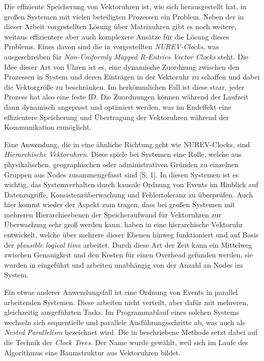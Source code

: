 Die effiziente Speicherung von Vektoruhren ist, wie sich herausgestellt hat, in großen Systemen mit vielen beteiligten Prozessen ein Problem. Neben der in dieser Arbeit vorgestellten Lösung über Matrixuhren gibt es noch weitere, weitaus effizientere aber auch komplexere Ansätze für die Lösung dieses Problems. Eines davon sind die in \cite{Gidenstam2004} vorgestellten \textit{NUREV-Clocks}, was ausgeschreiben für \textit{Non-Uniformly Mapped R-Entries Vector Clocks} steht. Die Idee dieser Art von Uhren ist es, eine dynamische Zuordnung zwischen den Prozessen in System und deren Einträgen in der Vektoruhr zu schaffen und dabei die Vektorgröße zu beschränken. Im herkömmlichen Fall ist diese starr, jeder Prozess hat also eine feste ID. Die Zuordnungen können während der Laufzeit dann dynamisch angepasst und optimiert werden, was im Endeffekt eine effizientere Speicherung und Übertragung der Vektoruhren während der Kommunikation ermöglicht.

Eine Anwendung, die in eine ähnliche Richtung geht wie NUREV-Clocks, sind \textit{Hierarchische Vektoruhren}. Diese spiele bei Systemen eine Rolle, welche aus physikalischen, geographischen oder administrativen Gründen zu einzelnen Gruppen aus Nodes zusammengefasst sind \cite{Khotimsky1999}[S. 1]. In diesen Systemen ist es wichtig, das Systemverhalten durch kausale Ordnung von Events im Hinblick auf Datenzugriffe, Konsistenzüberwachung und Fehlertoleranz zu überprüfen. Auch hier kommt wieder der Aspekt zum tragen, dass bei großen Systemen mit mehreren Hierarchieebenen der Speicheraufwand für Vektoruhren zur Überwachung sehr groß werden kann.  haben in  \cite{Khotimsky1999} eine hierarchische Vektoruhr entwickelt, welche über mehrere dieser Ebenen hinweg funktioniert und auf Basis der \textit{plausible logical time} arbeitet. Durch diese Art der Zeit kann ein Mittelweg zwischen Genauigkeit und den Kosten für einen Overhead gefunden werden, sie wurden in \cite{torres1999plausible} eingeführt und arbeiten unabhängig von der Anzahl an Nodes im System.

Ein etwas anderer Anwendungsfall ist eine Ordnung von Events in parallel arbeitenden Systemen. Diese arbeiten nicht verteilt, aber dafür mit mehreren, gleichzeitig ausgeführten Tasks. Im Programmablauf eines solchen Systems wechseln sich sequentielle und parallele Ausführungsschritte ab, was auch als \textit{Nested Parallelism} bezeichnet wird. Die in \cite{Audenaert1997} beschriebene Methode setzt dabei auf die Technik der \textit{Clock Trees}. Der Name wurde gewählt, weil sich im Laufe des Algorithmus eine Baumstruktur aus Vektoruhren bildet.


